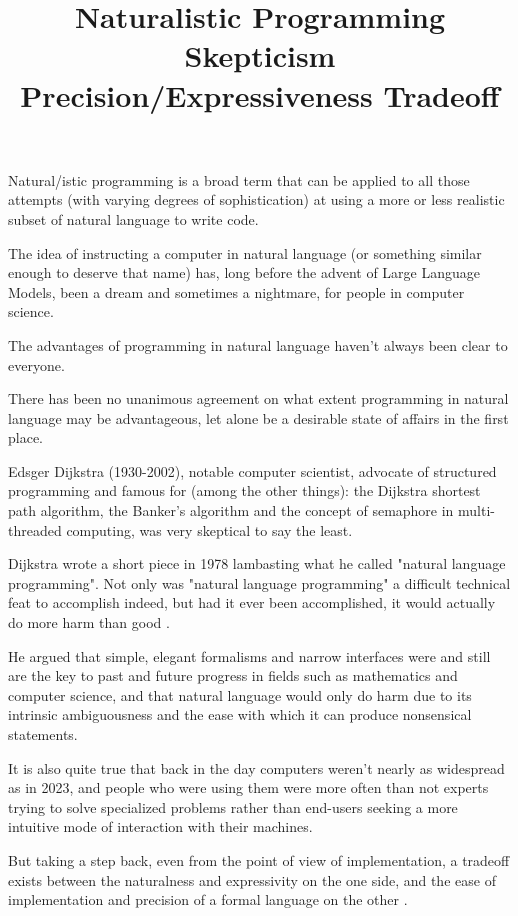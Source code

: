 \title{ Naturalistic Programming}

Natural/istic programming is a broad term that can be applied to all those attempts (with varying degrees of sophistication) at using a more or less realistic subset of natural language to write code.

The idea of instructing a computer in natural language (or something similar enough to deserve that name) has, long before the advent of Large Language Models, been a dream and sometimes a nightmare, for people in computer science.

\title{ Skepticism}

The advantages of programming in natural language haven't always been clear to everyone.

There has been no unanimous agreement on what extent programming in natural language may be advantageous, let alone be a desirable state of affairs in the first place.

Edsger Dijkstra (1930-2002), notable computer scientist, advocate of structured programming and famous for (among the other things): the Dijkstra shortest path algorithm, the Banker's algorithm and the concept of semaphore in multi-threaded computing, was very skeptical to say the least.

Dijkstra wrote a short piece in 1978 lambasting what he called "natural language programming". Not only was "natural language programming" a difficult technical feat to accomplish indeed, but had it ever been accomplished, it would actually do more harm than good \cite{foolishnessnatprogramming}.

He argued that simple, elegant formalisms and narrow interfaces were and still are the key to past and future progress in fields such as mathematics and computer science, and that natural language would only do harm due to its intrinsic ambiguousness and the ease with which it can produce nonsensical statements. 

It is also quite true that back in the day computers weren't nearly as widespread as in 2023, and people who were using them were more often than not experts trying to solve specialized problems rather than end-users seeking a more intuitive mode of interaction with their machines.

\title{ Precision/Expressiveness Tradeoff}

But taking a step back, even from the point of view of implementation, a tradeoff exists between the naturalness and expressivity on the one side, and the ease of implementation and precision of a formal language on the other \cite{kuhn2014survey}.

